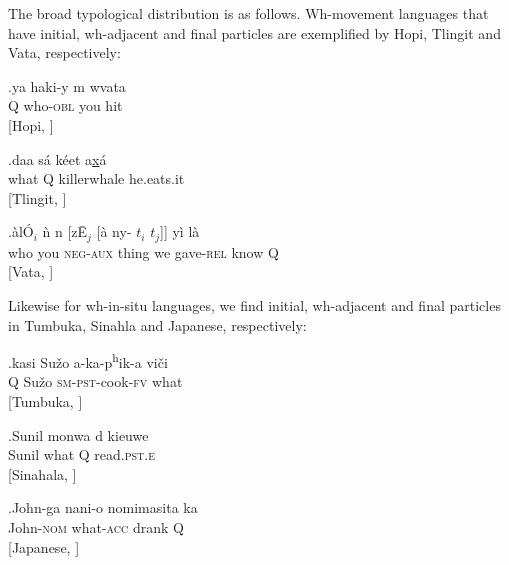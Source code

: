 \documentclass{glossa}
\begin{document}
The broad typological distribution is as follows. Wh-movement languages that have initial, wh-adjacent and final particles are exemplified by Hopi, Tlingit and Vata, respectively:


\exg.\label{wh.50}ya haki-y {\textraiseglotstop\textbari}m w{\textbari}va{\textraiseglotstop}ta \\
  Q who-\textsc{obl} you hit \\
  \hspace{\fill}[Hopi, \cite{jeanne:1978}]

\exg.\label{wh.60}daa s\'a k\'eet a\underline{x}\'a \\
  what Q killerwhale he.eats.it \\
  \hspace{\fill}[Tlingit, \cite{cable:2007}]

\exg.\label{wh.70}\`al\'O$_i$ \`n n{} [z\={E}$_j$ [\`a ny{}-{} $t_i$ $t_j$]] y\`i l\`a\\
  who you \textsc{neg-aux} thing we gave-\textsc{rel} {} {} know Q \\
  \hspace{\fill}[Vata, \cite{koopman:1984}]

Likewise for wh-in-situ languages, we find initial, wh-adjacent and final particles in Tumbuka, Sinahla and Japanese, respectively:

\exg.\label{wh.80}kasi Su\v{z}o a-ka-p\textsuperscript{h}ik-a vi\v{c}i \\
  Q Su\v{z}o \textsc{sm-pst}-cook-\textsc{fv} what \\
  \hspace{\fill}[Tumbuka, \cite{kimper:2006}]

\exg.\label{wh.90}Sunil mon{\textschwa}wa {d\textschwa} kieuwe \\
  Sunil what Q read.\textsc{pst.e} \\
  \hspace{\fill}[Sinahala, \cite{slade:2011}]

\exg.\label{wh.100}John-ga nani-o nomimasita ka \\
  John-\textsc{nom} what-\textsc{acc} drank Q \\
  \hspace{\fill}[Japanese, \cite{hagstrom:1998}]
\end{document}
